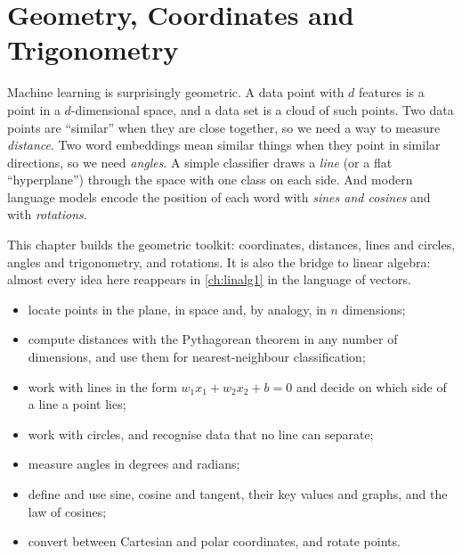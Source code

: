 \chapter{Geometry, Coordinates and Trigonometry}\label{ch:geometry}

\begin{motivation}
Machine learning is surprisingly geometric. A data point with $d$ features is a
point in a $d$-dimensional space, and a data set is a cloud of such points.
Two data points are ``similar'' when they are close together, so we need a way
to measure \emph{distance}. Two word embeddings mean similar things when they
point in similar directions, so we need \emph{angles}. A simple classifier
draws a \emph{line} (or a flat ``hyperplane'') through the space with one class
on each side. And modern language models encode the position of each word with
\emph{sines and cosines} and with \emph{rotations}.

This chapter builds the geometric toolkit: coordinates, distances, lines and
circles, angles and trigonometry, and rotations. It is also the bridge to
linear algebra: almost every idea here reappears in \cref{ch:linalg1} in the
language of vectors.
\end{motivation}

\begin{objectives}
\begin{itemize}
  \item locate points in the plane, in space and, by analogy, in $n$
    dimensions;
  \item compute distances with the Pythagorean theorem in any number of
    dimensions, and use them for nearest-neighbour classification;
  \item work with lines in the form $w_1x_1 + w_2x_2 + b = 0$ and decide on
    which side of a line a point lies;
  \item work with circles, and recognise data that no line can separate;
  \item measure angles in degrees and radians;
  \item define and use sine, cosine and tangent, their key values and graphs,
    and the law of cosines;
  \item convert between Cartesian and polar coordinates, and rotate points.
\end{itemize}
\end{objectives}

